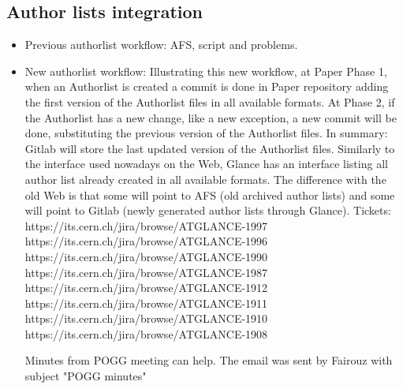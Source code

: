 \subsection{Author lists integration}%
\label{sec:auth}

\begin{itemize}
\item Previous authorlist workflow:
AFS, script and problems.

\item New authorlist workflow:
Illustrating this new workflow, at Paper Phase 1, when an Authorlist is created a commit is done in Paper repository adding the first version of the Authorlist files in all available formats. At Phase 2, if the Authorlist has a new change, like a new exception, a new commit will be done, substituting the previous version of the Authorlist files.
In summary: Gitlab will store the last updated version of the Authorlist files.
Similarly to the interface used nowadays on the Web, Glance has an interface listing all author list already created in all available formats. The difference with the old Web is that some will point to AFS (old archived author lists) and some will point to Gitlab (newly generated author lists through Glance).
Tickets:
https://its.cern.ch/jira/browse/ATGLANCE-1997
https://its.cern.ch/jira/browse/ATGLANCE-1996
https://its.cern.ch/jira/browse/ATGLANCE-1990
https://its.cern.ch/jira/browse/ATGLANCE-1987
https://its.cern.ch/jira/browse/ATGLANCE-1912
https://its.cern.ch/jira/browse/ATGLANCE-1911
https://its.cern.ch/jira/browse/ATGLANCE-1910
https://its.cern.ch/jira/browse/ATGLANCE-1908

Minutes from POGG meeting can help. The email was sent by Fairouz with subject "POGG minutes"
\end{itemize}
